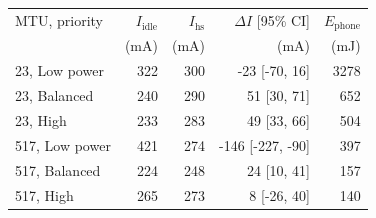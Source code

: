\begin{tabular}{lrrrr}
\toprule
MTU, priority & $I_\mathrm{idle}$ & $I_\mathrm{hs}$ & $\Delta I$ [95\% CI] & $E_\mathrm{phone}$ \\
 & (mA) & (mA) & (mA) & (mJ) \\
\midrule
23, Low power & 322 & 300 & -23 [-70, 16] & 3278 \\
23, Balanced & 240 & 290 & 51 [30, 71] & 652 \\
23, High & 233 & 283 & 49 [33, 66] & 504 \\
517, Low power & 421 & 274 & -146 [-227, -90] & 397 \\
517, Balanced & 224 & 248 & 24 [10, 41] & 157 \\
517, High & 265 & 273 & 8 [-26, 40] & 140 \\
\bottomrule
\end{tabular}
